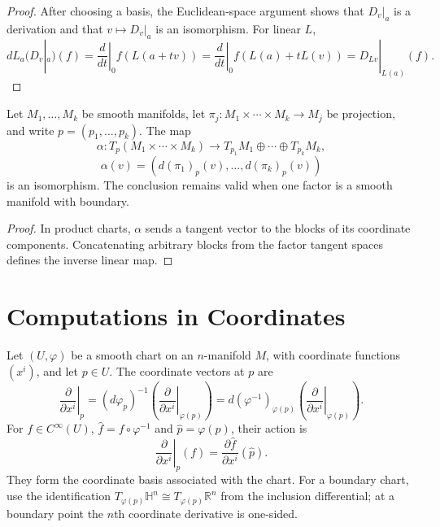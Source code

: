 \begin{proof}
\leanok
\sketch
After choosing a basis, the Euclidean-space argument shows that $D_v|_a$ is
a derivation and that $v\mapsto D_v|_a$ is an isomorphism. For linear $L$,
\[
dL_a(D_v|_a)(f)
=\left.\frac{d}{dt}\right|_{0}f(L(a+tv))
=\left.\frac{d}{dt}\right|_{0}f(L(a)+tL(v))
=D_{Lv}|_{L(a)}(f).
\]
\end{proof}

\begin{proposition}
\label{prop:3-14}
\leanok
{}
Let $M_1,\ldots,M_k$ be smooth manifolds, let
$\pi_j:M_1\times\cdots\times M_k\to M_j$ be projection, and write
$p=(p_1,\ldots,p_k)$. The map
\[
\alpha:T_p(M_1\times\cdots\times M_k)
\longrightarrow T_{p_1}M_1\oplus\cdots\oplus T_{p_k}M_k,
\]
\[
\alpha(v)=(d(\pi_1)_p(v),\ldots,d(\pi_k)_p(v)) \tag{3.7}
\]
is an isomorphism. The conclusion remains valid when one factor is a smooth
manifold with boundary.
\end{proposition}

\begin{proof}
\leanok
\sketch In product charts, $\alpha$ sends a tangent vector to the blocks of its
coordinate components. Concatenating arbitrary blocks from the factor tangent
spaces defines the inverse linear map.
\end{proof}


\section{Computations in Coordinates}

\begin{definition}
\label{def:3-15-extra-1}
\leanok
{}
Let $(U,\varphi)$ be a smooth chart on an $n$-manifold $M$, with coordinate
functions $(x^i)$, and let $p\in U$. The coordinate vectors at $p$ are
\[
\left.\frac{\partial}{\partial x^i}\right|_p
=(d\varphi_p)^{-1}
 \left(\left.\frac{\partial}{\partial x^i}\right|_{\varphi(p)}\right)
=d(\varphi^{-1})_{\varphi(p)}
 \left(\left.\frac{\partial}{\partial x^i}\right|_{\varphi(p)}\right). \tag{3.8}
\]
For $f\in C^\infty(U)$, $\widehat f=f\circ\varphi^{-1}$ and
$\widehat p=\varphi(p)$, their action is
\[
\left.\frac{\partial}{\partial x^i}\right|_p(f)
=\frac{\partial\widehat f}{\partial x^i}(\widehat p).
\]
They form the coordinate basis associated with the chart. For a boundary
chart, use the identification
$T_{\varphi(p)}\mathbb{H}^n\cong T_{\varphi(p)}\mathbb{R}^n$ from the
inclusion differential; at a boundary point the $n$th coordinate derivative
is one-sided.
\end{definition}

